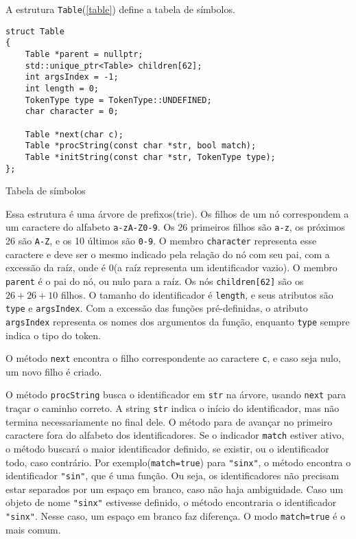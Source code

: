 \documentclass[10pt,a4paper]{article}
\newenvironment{code}{\captionsetup{type=listing}}{}
\begin{document}
A estrutura \texttt{Table}(\ref{table}) define a tabela de símbolos.

\begin{code}
\begin{verbatim}
struct Table
{
    Table *parent = nullptr;
    std::unique_ptr<Table> children[62];
    int argsIndex = -1;
    int length = 0;
    TokenType type = TokenType::UNDEFINED;
    char character = 0;

    Table *next(char c);
    Table *procString(const char *str, bool match);
    Table *initString(const char *str, TokenType type);
};
\end{verbatim}
\caption{Tabela de símbolos}
\label{table}
\end{code}

Essa estrutura é uma árvore de prefixos(trie).
Os filhos de um nó correspondem a um caractere do alfabeto \texttt{a-zA-Z0-9}.
Os 26 primeiros filhos são \texttt{a-z}, os próximos 26 são \texttt{A-Z}, e os 10 últimos são \texttt{0-9}.
O membro \texttt{character} representa esse caractere e deve ser o mesmo indicado pela relação do nó com seu pai,
com a excessão da raíz, onde é 0(a raíz representa um identificador vazio).
O membro \texttt{parent} é o pai do nó, ou nulo para a raíz.
Os nós \texttt{children[62]} são os $26+26+10$ filhos.
O tamanho do identificador é \texttt{length}, e seus atributos são \texttt{type} e \texttt{argsIndex}.
Com a excessão das funções pré-definidas, o atributo \texttt{argsIndex} representa os nomes dos argumentos da função,
enquanto \texttt{type} sempre indica o tipo do token.

O método \texttt{next} encontra o filho correspondente ao caractere \texttt{c}, e caso seja nulo,
um novo filho é criado.

O método \texttt{procString} busca o identificador em \texttt{str} na árvore,
usando \texttt{next} para traçar o caminho correto.
A string \texttt{str} indica o início do identificador, mas não termina necessariamente no final dele.
O método para de avançar no primeiro caractere fora do alfabeto dos identificadores.
Se o indicador \texttt{match} estiver ativo, o método buscará o maior identificador definido,
se existir, ou o identificador todo, caso contrário.
Por exemplo(\texttt{match=true}) para \texttt{"sinx"}, o método encontra o identificador \texttt{"sin"},
que é uma função. Ou seja, os identificadores não precisam estar separados por um espaço em branco,
caso não haja ambiguidade.
Caso um objeto de nome \texttt{"sinx"} estivesse definido,
o método encontraria o identificador \texttt{"sinx"}.
Nesse caso, um espaço em branco faz diferença. O modo \texttt{match=true} é o mais comum.
\end{document}
